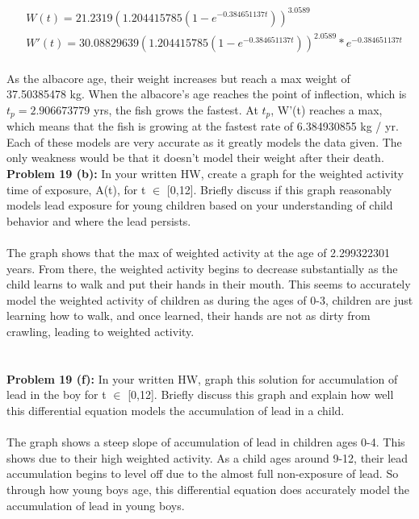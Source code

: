 \documentclass[12pt]{article}
\begin{document}
\begin{align*}
	&W(t) =  21.2319 (1.204415785(1 - e^{-0.384651137t}))^{3.0589} \\
	&W'(t) = 30.08829639(1.204415785(1-e^{-0.384651137t}))^{2.0589}*e^{-0.384651137t}
\end{align*}
\\
\noindent As the albacore age, their weight increases but reach a max weight of 37.50385478 kg.  When the albacore's age reaches the point of inflection, which is $t_p = 2.906673779$ yrs, the fish grows the fastest. At $t_p$, W'(t) reaches a max, which means that the fish is growing at the fastest rate of 6.384930855 kg / yr.  Each of these models are very accurate as it greatly models the data given.  The only weakness would be that it doesn't model their weight after their death.
\newpage
\textbf{Problem 19 (b): } In your written HW, create a graph for the weighted activity time of exposure, A(t), for t $\in$ [0,12]. Briefly discuss if this graph reasonably models lead exposure for young children based on your understanding of child behavior and where the lead persists.
\\\\
The graph shows that the max of weighted activity at the age of 2.299322301 years.  From there, the weighted activity begins to decrease substantially as the child learns to walk and put their hands in their mouth.  This seems to accurately model the weighted activity of children as during the ages of 0-3, children are just learning how to walk, and once learned, their hands are not as dirty from crawling, leading to weighted activity.
\\\\\\
\indent \textbf{Problem 19 (f): } In your written HW, graph this solution for accumulation of lead in the boy for t $\in$ [0,12]. Briefly discuss this graph and explain how well this differential equation models the accumulation of lead in a child.
\\\\
The graph shows a steep slope of accumulation of lead in children ages 0-4.  This shows due to their high weighted activity.  As a child ages around 9-12, their lead accumulation begins to level off due to the almost full non-exposure of lead.  So through how young boys age, this differential equation does accurately model the accumulation of lead in young boys.
\\\\\\
\end{document}
